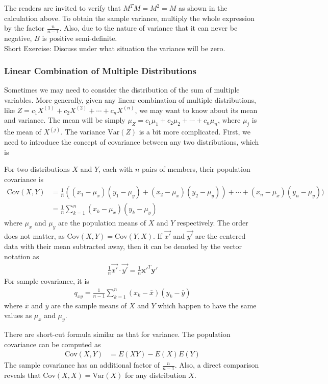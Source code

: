 The readers are invited to verify that $M^TM = M^2 = M$ as shown in the calculation above. To obtain the sample variance, multiply the whole expression by the factor $\frac{n}{n-1}$. Also, due to the nature of variance that it can never be negative, $B$ is positive semi-definite.\\
Short Exercise: Discuss under what situation the variance will be zero.

\subsubsection{Linear Combination of Multiple Distributions}
Sometimes we may need to consider the distribution of the sum of multiple variables. More generally, given any linear combination of multiple distributions, like $Z = c_1X^{(1)} + c_2X^{(2)} + \cdots + c_nX^{(n)}$, we may want to know about its mean and variance. The mean will be simply $\mu_Z = c_1\mu_1 + c_2\mu_2 + \cdots + c_n\mu_n$, where $\mu_j$ is the mean of $X^{(j)}$. The variance $\text{Var}(Z)$ is a bit more complicated. First, we need to introduce the concept of covariance between any two distributions, which is
\begin{defn}
\label{covariance}
For two distributions $X$ and $Y$, each with $n$ pairs of members, their population covariance is
\begin{align*}
\text{Cov}(X,Y) &= \frac{1}{n}((x_1-\mu_x)(y_1-\mu_y) + (x_2-\mu_x)(y_2-\mu_y)) + \cdots + (x_n-\mu_x)(y_n-\mu_y)) \\
&= \frac{1}{n}\sum_{k=1}^{n} (x_k-\mu_x)(y_k-\mu_y)
\end{align*}
where $\mu_x$ and $\mu_y$ are the population means of $X$ and $Y$ respectively. The order does not matter, as $\text{Cov}(X,Y) = \text{Cov}(Y,X)$. If $\vec{x'}$ and $\vec{y'}$ are the centered data with their mean subtracted away, then it can be denoted by the vector notation as
\begin{align*}
\frac{1}{n} \vec{x'} \cdot \vec{y'} = \frac{1}{n} \textbf{x}'^T \textbf{y}'
\end{align*}
For sample covariance, it is
\begin{align*}
q_{xy} = \frac{1}{n-1} \sum_{k=1}^{n} (x_k-\bar{x})(y_k-\bar{y})
\end{align*}
where $\bar{x}$ and $\bar{y}$ are the sample means of $X$ and $Y$ which happen to have the same values as $\mu_x$ and $\mu_y$.
\end{defn}
There are short-cut formula similar as that for variance. The population covariance can be computed as
\begin{align*}
\text{Cov}(X,Y) &= E(XY) - E(X)E(Y)    
\end{align*}
The sample covariance has an additional factor of $\frac{n}{n-1}$. Also, a direct comparison reveals that $\text{Cov}(X,X) = \text{Var}(X)$ for any distribution $X$.


